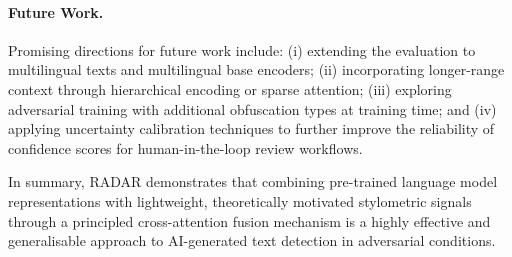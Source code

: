 \paragraph{Future Work.}
Promising directions for future work include: (i) extending the evaluation to multilingual
texts and multilingual base encoders; (ii) incorporating longer-range context through
hierarchical encoding or sparse attention; (iii) exploring adversarial training with
additional obfuscation types at training time; and (iv) applying uncertainty calibration
techniques to further improve the reliability of confidence scores for human-in-the-loop
review workflows.

In summary, RADAR demonstrates that combining pre-trained language model representations
with lightweight, theoretically motivated stylometric signals through a principled
cross-attention fusion mechanism is a highly effective and generalisable approach to
AI-generated text detection in adversarial conditions.
